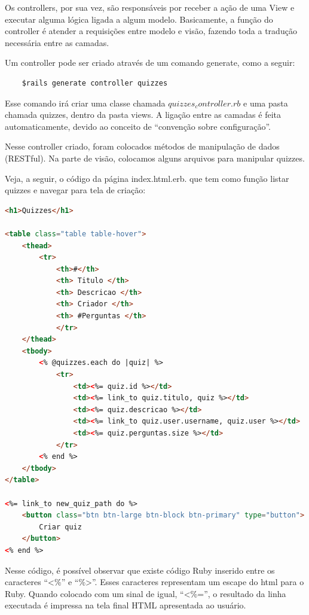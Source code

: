             Os controllers, por sua vez, são responsáveis por receber a ação de uma View e executar alguma lógica ligada a algum modelo. Basicamente, a função do controller é atender a requisições entre modelo e visão, fazendo toda a tradução necessária entre as camadas.
			
            Um controller pode ser criado através de um comando generate, como a seguir:
	\begin{lstlisting}
    $rails generate controller quizzes
    \end{lstlisting} 
            Esse comando irá criar uma classe chamada $quizzes_controller.rb$ e uma pasta chamada quizzes, dentro da pasta views. A ligação entre as camadas é feita automaticamente, devido ao conceito de ``convenção sobre configuração''.
			
            Nesse controller criado, foram colocados métodos de manipulação de dados (RESTful). Na parte de visão, colocamos alguns arquivos para manipular quizzes.  
			
            Veja, a seguir, o código da página index.html.erb. que tem como função listar quizzes e navegar para tela de criação:
\begin{lstlisting}[language=HTML]
<h1>Quizzes</h1>
     
<table class="table table-hover">
    <thead>
        <tr>
            <th>#</th>
            <th> Titulo </th>
            <th> Descricao </th>
            <th> Criador </th>
            <th> #Perguntas </th>
			</tr>
    </thead>
    <tbody>
	    <% @quizzes.each do |quiz| %>
            <tr>
                <td><%= quiz.id %></td>
                <td><%= link_to quiz.titulo, quiz %></td>
                <td><%= quiz.descricao %></td>
                <td><%= link_to quiz.user.username, quiz.user %></td>
                <td><%= quiz.perguntas.size %></td>
            </tr>
        <% end %>
    </tbody>
</table>
     
<%= link_to new_quiz_path do %>
    <button class="btn btn-large btn-block btn-primary" type="button">
        Criar quiz
    </button>
<% end %>
 \end{lstlisting} 
 
             Nesse código, é possível observar que existe código Ruby inserido entre os caracteres ``<\%'' e ``\%>''. Esses caracteres representam um escape do html para  o Ruby. Quando colocado com um sinal de igual, ``<\%='', o resultado da linha executada é impressa na tela final \ac{HTML} apresentada ao usuário.
			 
